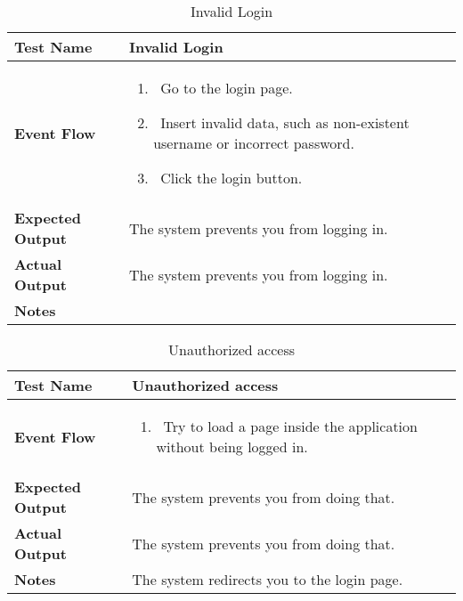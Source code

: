 \begin{table}[h]	
\centering
\def\arraystretch{1.5}
\begin{tabular}{|m{7cm}|m{7cm}|}
	\hline
	\textbf{Test Name}            &  Invalid Login  \\ \hline
	\textbf{Event Flow}             &  
		\begin{enumerate}
				\item~Go to the login page.
				\item~Insert invalid data, such as non-existent username or incorrect password.
				\item~Click the login button.
		\end{enumerate}
		 \\ \hline
	\textbf{Expected Output}  &  The system prevents you from logging in.  \\ \hline
	\textbf{Actual Output}       &  The system prevents you from logging in.   \\ \hline
	\textbf{Notes} & \\ \hline
\end{tabular}
\caption{Invalid Login}
\end{table}


\begin{table}[h]	
	\centering
	\def\arraystretch{1.5}
	\begin{tabular}{|m{7cm}|m{7cm}|}
		\hline
		\textbf{Test Name}            &  Unauthorized access  \\ \hline
		\textbf{Event Flow}             &  
		\begin{enumerate}
			\item~Try to load a page inside the application without being logged in.
		\end{enumerate}
		\\ \hline
		\textbf{Expected Output}  &  The system prevents you from doing that.   \\ \hline
		\textbf{Actual Output}       &  The system prevents you from doing that.   \\ \hline
		\textbf{Notes} & The system redirects you to the login page. \\ \hline
	\end{tabular}
	\caption{Unauthorized access}
\end{table}


